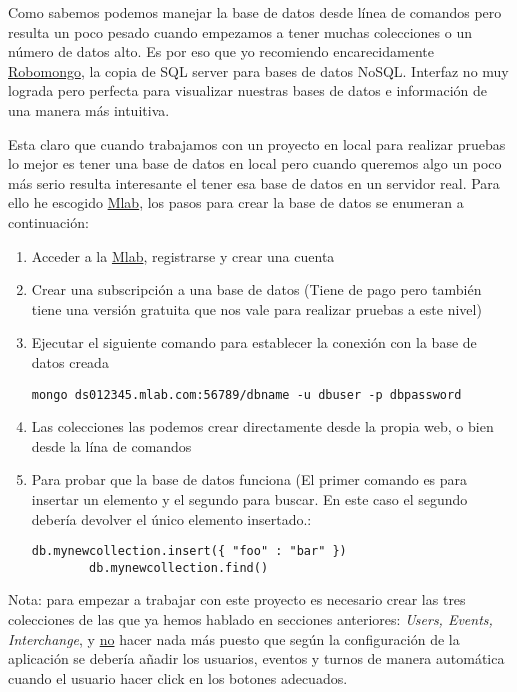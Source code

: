 Como sabemos podemos manejar la base de datos desde línea de comandos pero resulta un poco pesado cuando empezamos a tener muchas colecciones o un número de datos alto. Es por eso que yo recomiendo encarecidamente  \hyperlink{https://robomongo.org/}{Robomongo}, la copia de SQL server para bases de datos NoSQL.  Interfaz no muy lograda pero perfecta para visualizar nuestras bases de datos e información de una manera más intuitiva.

	
	Esta claro que cuando trabajamos con un proyecto en local para realizar pruebas lo mejor es tener una base de datos en local pero cuando queremos algo un poco más serio resulta interesante el tener esa base de datos en un servidor real. Para ello he escogido \hyperlink{mlab.com}{Mlab}, los pasos para crear la base de datos se enumeran a continuación: 
	
	\begin{enumerate}
	\item Acceder a la \hyperlink{mlab.com}{Mlab}, registrarse y crear una cuenta
	\item Crear una subscripción a una base de datos (Tiene de pago pero también tiene una versión gratuita que nos vale para realizar pruebas a este nivel)
	\item Ejecutar el siguiente comando para establecer la conexión con la base de datos creada
		\lstset{language=C, breaklines=true, basicstyle=\footnotesize}
		\begin{lstlisting}[frame=single]
		mongo ds012345.mlab.com:56789/dbname -u dbuser -p dbpassword
    	\end{lstlisting}
	\item Las colecciones las podemos crear directamente desde la propia web, o bien desde la lína de comandos 
	\item Para probar que la base de datos funciona (El primer comando es para insertar un elemento y el segundo para buscar. En este caso el segundo debería devolver el único elemento insertado.:
		\lstset{language=C, breaklines=true, basicstyle=\footnotesize}
		\begin{lstlisting}[frame=single]
		db.mynewcollection.insert({ "foo" : "bar" })
		db.mynewcollection.find() 
    	\end{lstlisting}	
\end{enumerate}

Nota: para empezar a trabajar con este proyecto es necesario crear las tres colecciones de las que ya hemos hablado en secciones anteriores: \emph{Users, Events, Interchange}, y \underline{no} hacer nada más puesto que según la configuración de la aplicación se debería añadir los usuarios, eventos y turnos de manera automática cuando el usuario hacer click en los botones adecuados. 


